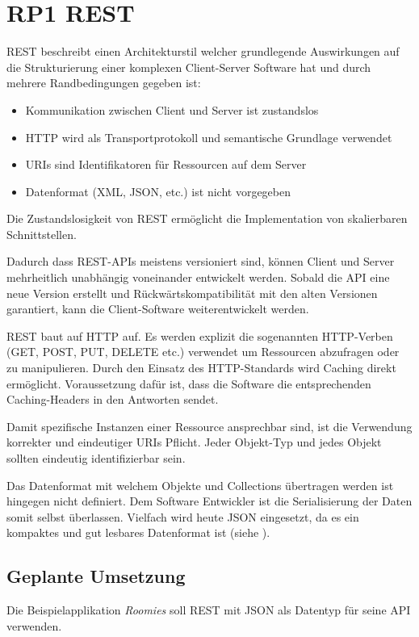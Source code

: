 \section{RP1 REST}
\label{sec:principle-rp1-rest}

\gls{REST} \cite{REST} beschreibt einen Architekturstil welcher grundlegende Auswirkungen auf die Strukturierung einer komplexen Client-Server Software hat und durch mehrere Randbedingungen gegeben ist:
\begin{itemize}
	\item Kommunikation zwischen Client und Server ist zustandslos
	\item HTTP wird als Transportprotokoll und semantische Grundlage verwendet
	\item \glspl{URI} sind Identifikatoren für Ressourcen auf dem Server
	\item Datenformat (XML, JSON, etc.) ist nicht vorgegeben
\end{itemize}

Die Zustandslosigkeit von REST ermöglicht die Implementation von skalierbaren Schnittstellen.

Dadurch dass REST-APIs meistens versioniert sind, können Client und Server mehrheitlich unabhängig voneinander entwickelt werden.
Sobald die API eine neue Version erstellt und Rückwärtskompatibilität mit den alten Versionen garantiert, kann die Client-Software weiterentwickelt werden.

REST baut auf HTTP auf. Es werden explizit die sogenannten HTTP-Verben (GET, POST, PUT, DELETE etc.) verwendet um Ressourcen abzufragen oder zu manipulieren.
Durch den Einsatz des HTTP-Standards wird Caching direkt ermöglicht. Voraussetzung dafür ist, dass die Software die entsprechenden Caching-Headers in den Antworten sendet.

Damit spezifische Instanzen einer Ressource ansprechbar sind, ist die Verwendung korrekter und eindeutiger \glspl{URI} Pflicht. Jeder Objekt-Typ und jedes Objekt sollten eindeutig identifizierbar sein.

Das Datenformat mit welchem Objekte und Collections übertragen werden ist hingegen nicht definiert. Dem Software Entwickler ist die Serialisierung der Daten somit selbst überlassen.
Vielfach wird heute \gls{JSON} eingesetzt, da es ein kompaktes und gut lesbares Datenformat ist (siehe \cite{ProgrammableWebByeXML}).

\subsection*{Geplante Umsetzung}
Die Beispielapplikation \emph{Roomies} soll REST mit JSON als Datentyp für seine API verwenden.

